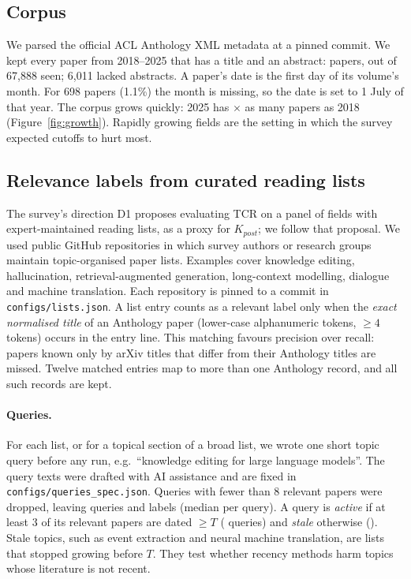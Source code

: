 \documentclass[acmsmall]{acmart}
\begin{document}
\subsection{Corpus}
We parsed the official ACL Anthology XML metadata \cite{aclanthology} at a pinned commit. We kept every paper from 2018--2025 that has a title and an abstract: \NDocs{} papers, out of 67,888 seen; 6,011 lacked abstracts. A paper's date is the first day of its volume's month. For 698 papers (1.1\%) the month is missing, so the date is set to 1 July of that year. The corpus grows quickly: 2025 has \Growth$\times$ as many papers as 2018 (Figure~\ref{fig:growth}). Rapidly growing fields are the setting in which the survey expected cutoffs to hurt most.

\subsection{Relevance labels from curated reading lists}
The survey's direction D1 proposes evaluating TCR on a panel of fields with expert-maintained reading lists, as a proxy for $K_{post}$; we follow that proposal. We used \NLists{} public GitHub repositories in which survey authors or research groups maintain topic-organised paper lists. Examples cover knowledge editing, hallucination, retrieval-augmented generation, long-context modelling, dialogue and machine translation. Each repository is pinned to a commit in \texttt{configs/lists.json}. A list entry counts as a relevant label only when the \emph{exact normalised title} of an Anthology paper (lower-case alphanumeric tokens, $\geq 4$ tokens) occurs in the entry line. This matching favours precision over recall: papers known only by arXiv titles that differ from their Anthology titles are missed. Twelve matched entries map to more than one Anthology record, and all such records are kept.

\paragraph{Queries.} For each list, or for a topical section of a broad list, we wrote one short topic query before any run, e.g.\ ``knowledge editing for large language models''. The query texts were drafted with AI assistance and are fixed in \texttt{configs/queries\_spec.json}. Queries with fewer than 8 relevant papers were dropped, leaving \NQueries{} queries and \NJudg{} labels (median \MedRel{} per query). A query is \emph{active} if at least 3 of its relevant papers are dated $\geq T$ (\NActive{} queries) and \emph{stale} otherwise (\NStale{}). Stale topics, such as event extraction and neural machine translation, are lists that stopped growing before $T$. They test whether recency methods harm topics whose literature is not recent.
\end{document}
